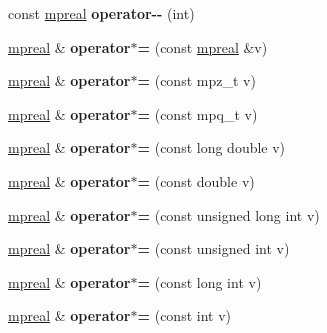 \begin{DoxyCompactItemize}
const \hyperlink{classmpfr_1_1mpreal}{mpreal} {\bfseries operator-\/-\/} (int)
\item 
\mbox{\label{classmpfr_1_1mpreal_a3f74af400dce1b806988bbc1b2e71f7f}} 
\hyperlink{classmpfr_1_1mpreal}{mpreal} \& {\bfseries operator$\ast$=} (const \hyperlink{classmpfr_1_1mpreal}{mpreal} \&v)
\item 
\mbox{\label{classmpfr_1_1mpreal_a1f3bcd9404bcdf88809f3be75858173b}} 
\hyperlink{classmpfr_1_1mpreal}{mpreal} \& {\bfseries operator$\ast$=} (const mpz\+\_\+t v)
\item 
\mbox{\label{classmpfr_1_1mpreal_a614dbd44cff679973e73912f5134065a}} 
\hyperlink{classmpfr_1_1mpreal}{mpreal} \& {\bfseries operator$\ast$=} (const mpq\+\_\+t v)
\item 
\mbox{\label{classmpfr_1_1mpreal_a42ce49a390792207414606eb2e8c3c23}} 
\hyperlink{classmpfr_1_1mpreal}{mpreal} \& {\bfseries operator$\ast$=} (const long double v)
\item 
\mbox{\label{classmpfr_1_1mpreal_ac37a367924c0c68781e524ad5a57ecea}} 
\hyperlink{classmpfr_1_1mpreal}{mpreal} \& {\bfseries operator$\ast$=} (const double v)
\item 
\mbox{\label{classmpfr_1_1mpreal_a885eea4cadb32ee7629415e0e4417f04}} 
\hyperlink{classmpfr_1_1mpreal}{mpreal} \& {\bfseries operator$\ast$=} (const unsigned long int v)
\item 
\mbox{\label{classmpfr_1_1mpreal_a128a405177e3b45ac206a84fa8399bfd}} 
\hyperlink{classmpfr_1_1mpreal}{mpreal} \& {\bfseries operator$\ast$=} (const unsigned int v)
\item 
\mbox{\label{classmpfr_1_1mpreal_a0f53d551514bb8be2a4f61b2c987acd7}} 
\hyperlink{classmpfr_1_1mpreal}{mpreal} \& {\bfseries operator$\ast$=} (const long int v)
\item 
\mbox{\label{classmpfr_1_1mpreal_adb093a9fc2c67022b88f147f9402420b}} 
\hyperlink{classmpfr_1_1mpreal}{mpreal} \& {\bfseries operator$\ast$=} (const int v)
\item 

\end{DoxyCompactItemize}
